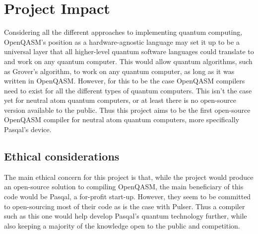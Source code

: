 \section{Project Impact}
\label{sec:impact}

Considering all the different approaches to implementing quantum computing, OpenQASM's position as a hardware-agnostic language may set it up to be
 a universal layer that all higher-level quantum software languages could translate to and work on any quantum computer. This would allow quantum algorithms, such as 
 Grover's algorithm, to work on any quantum computer, as long as it was written in OpenQASM. However, for this to be the case OpenQASM compilers need to exist for all 
 the different types of quantum computers. This isn't the case yet for neutral atom quantum computers, or at least there is no open-source version available to the public.
 Thus this project aims to be the first open-source OpenQASM compiler for neutral atom quantum computers, more specifically Pasqal's device.

\subsection{Ethical considerations}
\label{sec:Impact ethics}
The main ethical concern for this project is that, while the project would produce an open-source solution to compiling OpenQASM, the main beneficiary of this code would
be Pasqal, a for-profit start-up. However, they seem to be committed to open-sourcing most of their code as is the case with Pulser. Thus a compiler such as this one would
help develop Pasqal's quantum technology further, while also keeping a majority of the knowledge open to the public and competition.